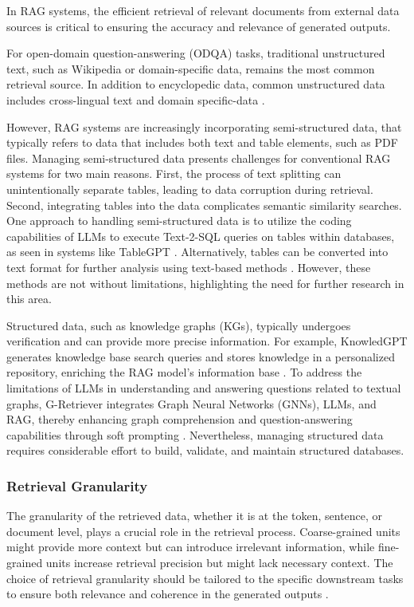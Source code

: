 In RAG systems, the efficient retrieval of relevant documents from external data sources is critical to ensuring the accuracy and relevance of generated outputs.

For open-domain question-answering (ODQA) tasks, traditional unstructured text, such as Wikipedia or domain-specific data, remains the most common retrieval source. In addition to encyclopedic data, common unstructured data includes cross-lingual text and domain specific-data \cite{li2023classification}.

However, RAG systems are increasingly incorporating semi-structured data, that typically refers to data that includes both text and table elements, such as PDF files. Managing semi-structured data presents challenges for conventional RAG systems for two main reasons. First, the process of text splitting can unintentionally separate tables, leading to data corruption during retrieval. Second, integrating tables into the data complicates semantic similarity searches. One approach to handling semi-structured data is to utilize the coding capabilities of LLMs to execute Text-2-SQL queries on tables within databases, as seen in systems like TableGPT \cite{zha2023tablegpt}. Alternatively, tables can be converted into text format for further analysis using text-based methods \cite{luo2023augmented}. However, these methods are not without limitations, highlighting the need for further research in this area.

Structured data, such as knowledge graphs (KGs), typically undergoes verification and can provide more precise information. For example, KnowledGPT generates knowledge base search queries and stores knowledge in a personalized repository, enriching the RAG model’s information base \cite{wang2023knowledgpt}. To address the limitations of LLMs in understanding and answering questions related to textual graphs, G-Retriever integrates Graph Neural Networks (GNNs), LLMs, and RAG, thereby enhancing graph comprehension and question-answering capabilities through soft prompting \cite{he2024g}. Nevertheless, managing structured data requires considerable effort to build, validate, and maintain structured databases.

\subsubsection{Retrieval Granularity}

The granularity of the retrieved data, whether it is at the token, sentence, or document level, plays a crucial role in the retrieval process. Coarse-grained units might provide more context but can introduce irrelevant information, while fine-grained units increase retrieval precision but might lack necessary context. The choice of retrieval granularity should be tailored to the specific downstream tasks to ensure both relevance and coherence in the generated outputs \cite{gao2023retrieval}.

